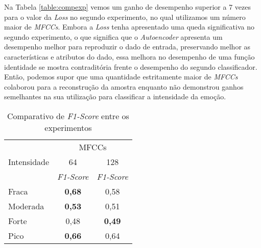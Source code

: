 Na Tabela \ref{table:compexp} vemos um ganho de desempenho superior a 7 vezes para o valor da \textit{Loss} no segundo experimento, no qual utilizamos um número maior de \textit{MFCCs}. Embora a \textit{Loss} tenha apresentado uma queda significativa no segundo experimento, o que significa que o \textit{Autoencoder} apresenta um desempenho melhor para reproduzir o dado de entrada, preservando melhor as características e atributos do dado, essa melhora no desempenho de uma função identidade se mostra contraditória frente o desempenho do segundo classificador. Então, podemos supor que uma quantidade estritamente maior de \textit{MFCCs} colaborou para a reconstrução da amostra enquanto não demonstrou ganhos semelhantes na sua utilização para classificar a intensidade da emoção.


\begin{table}[!h]
    \centering
    \begin{tabular}{|l|cc|}
    \hline
        \multicolumn{1}{|c|}{\multirow{3}{*}{Intensidade}} & \multicolumn{2}{c|}{MFCCs}                                 \\ \cline{2-3} 
        \multicolumn{1}{|c|}{}                             & \multicolumn{1}{c|}{64}                & 128               \\ \cline{2-3} 
        \multicolumn{1}{|c|}{}                             & \multicolumn{1}{c|}{\textit{F1-Score}} & \textit{F1-Score} \\ \hline
        Fraca                                              & \multicolumn{1}{c|}{\textbf{0,68}}     & 0,58              \\ \hline
        Moderada                                           & \multicolumn{1}{c|}{\textbf{0,53}}     & 0,51              \\ \hline
        Forte                                              & \multicolumn{1}{c|}{0,48}              & \textbf{0,49}     \\ \hline
        Pico                                               & \multicolumn{1}{c|}{\textbf{0,66}}     & 0,64              \\ \hline
    \end{tabular}
    \caption{\label{table:resultexp}Comparativo de \textit{F1-Score} entre os experimentos}
\end{table}

